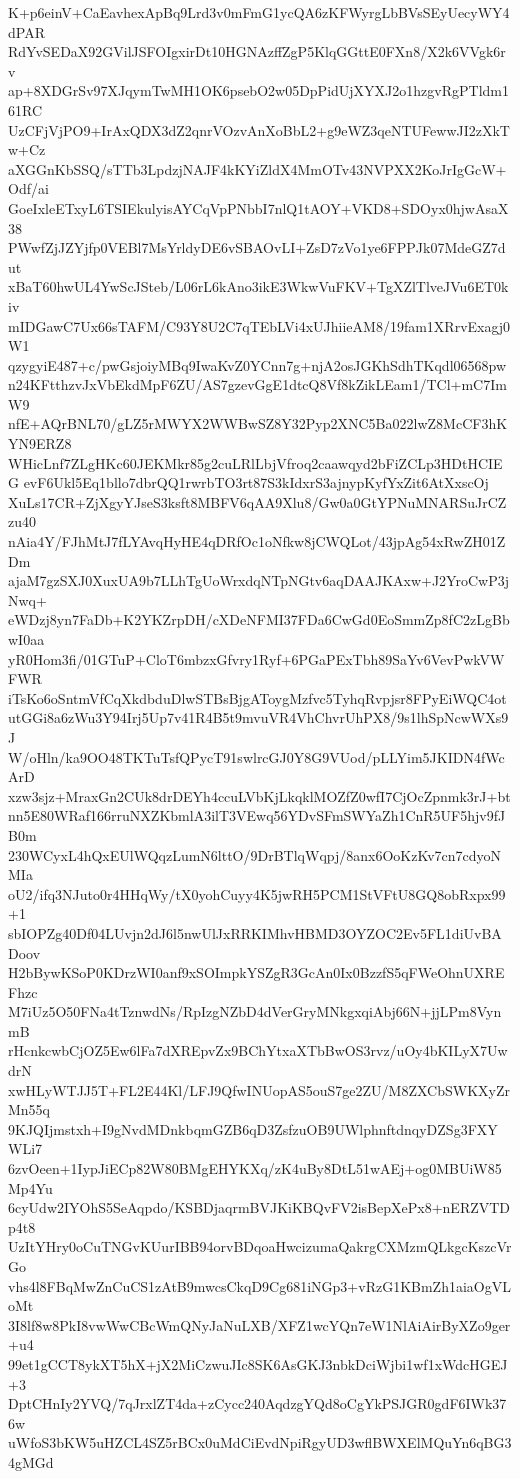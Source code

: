 K+p6einV+CaEavhexApBq9Lrd3v0mFmG1ycQA6zKFWyrgLbBVsSEyUecyWY4dPAR
RdYvSEDaX92GVilJSFOIgxirDt10HGNAzffZgP5KlqGGttE0FXn8/X2k6VVgk6rv
ap+8XDGrSv97XJqymTwMH1OK6psebO2w05DpPidUjXYXJ2o1hzgvRgPTldm161RC
UzCFjVjPO9+IrAxQDX3dZ2qnrVOzvAnXoBbL2+g9eWZ3qeNTUFewwJI2zXkTw+Cz
aXGGnKbSSQ/sTTb3LpdzjNAJF4kKYiZldX4MmOTv43NVPXX2KoJrIgGcW+Odf/ai
GoeIxleETxyL6TSIEkulyisAYCqVpPNbbI7nlQ1tAOY+VKD8+SDOyx0hjwAsaX38
PWwfZjJZYjfp0VEBl7MsYrldyDE6vSBAOvLI+ZsD7zVo1ye6FPPJk07MdeGZ7dut
xBaT60hwUL4YwScJSteb/L06rL6kAno3ikE3WkwVuFKV+TgXZlTlveJVu6ET0kiv
mIDGawC7Ux66sTAFM/C93Y8U2C7qTEbLVi4xUJhiieAM8/19fam1XRrvExagj0W1
qzygyiE487+c/pwGsjoiyMBq9IwaKvZ0YCnn7g+njA2osJGKhSdhTKqdl06568pw
n24KFtthzvJxVbEkdMpF6ZU/AS7gzevGgE1dtcQ8Vf8kZikLEam1/TCl+mC7ImW9
nfE+AQrBNL70/gLZ5rMWYX2WWBwSZ8Y32Pyp2XNC5Ba022lwZ8McCF3hKYN9ERZ8
WHicLnf7ZLgHKc60JEKMkr85g2cuLRlLbjVfroq2caawqyd2bFiZCLp3HDtHCIEG
evF6Ukl5Eq1bllo7dbrQQ1rwrbTO3rt87S3kIdxrS3ajnypKyfYxZit6AtXxscOj
XuLs17CR+ZjXgyYJseS3ksft8MBFV6qAA9Xlu8/Gw0a0GtYPNuMNARSuJrCZzu40
nAia4Y/FJhMtJ7fLYAvqHyHE4qDRfOc1oNfkw8jCWQLot/43jpAg54xRwZH01ZDm
ajaM7gzSXJ0XuxUA9b7LLhTgUoWrxdqNTpNGtv6aqDAAJKAxw+J2YroCwP3jNwq+
eWDzj8yn7FaDb+K2YKZrpDH/cXDeNFMI37FDa6CwGd0EoSmmZp8fC2zLgBbwI0aa
yR0Hom3fi/01GTuP+CloT6mbzxGfvry1Ryf+6PGaPExTbh89SaYv6VevPwkVWFWR
iTsKo6oSntmVfCqXkdbduDlwSTBsBjgAToygMzfvc5TyhqRvpjsr8FPyEiWQC4ot
utGGi8a6zWu3Y94Irj5Up7v41R4B5t9mvuVR4VhChvrUhPX8/9s1lhSpNcwWXs9J
W/oHln/ka9OO48TKTuTsfQPycT91swlrcGJ0Y8G9VUod/pLLYim5JKIDN4fWcArD
xzw3sjz+MraxGn2CUk8drDEYh4ccuLVbKjLkqklMOZfZ0wfI7CjOcZpnmk3rJ+bt
nn5E80WRaf166rruNXZKbmlA3ilT3VEwq56YDvSFmSWYaZh1CnR5UF5hjv9fJB0m
230WCyxL4hQxEUlWQqzLumN6lttO/9DrBTlqWqpj/8anx6OoKzKv7cn7cdyoNMIa
oU2/ifq3NJuto0r4HHqWy/tX0yohCuyy4K5jwRH5PCM1StVFtU8GQ8obRxpx99+1
sbIOPZg40Df04LUvjn2dJ6l5nwUlJxRRKIMhvHBMD3OYZOC2Ev5FL1diUvBADoov
H2bBywKSoP0KDrzWI0anf9xSOImpkYSZgR3GcAn0Ix0BzzfS5qFWeOhnUXREFhzc
M7iUz5O50FNa4tTznwdNs/RpIzgNZbD4dVerGryMNkgxqiAbj66N+jjLPm8VynmB
rHcnkcwbCjOZ5Ew6lFa7dXREpvZx9BChYtxaXTbBwOS3rvz/uOy4bKILyX7UwdrN
xwHLyWTJJ5T+FL2E44Kl/LFJ9QfwINUopAS5ouS7ge2ZU/M8ZXCbSWKXyZrMn55q
9KJQIjmstxh+I9gNvdMDnkbqmGZB6qD3ZsfzuOB9UWlphnftdnqyDZSg3FXYWLi7
6zvOeen+1IypJiECp82W80BMgEHYKXq/zK4uBy8DtL51wAEj+og0MBUiW85Mp4Yu
6cyUdw2IYOhS5SeAqpdo/KSBDjaqrmBVJKiKBQvFV2isBepXePx8+nERZVTDp4t8
UzItYHry0oCuTNGvKUurIBB94orvBDqoaHwcizumaQakrgCXMzmQLkgcKszcVrGo
vhs4l8FBqMwZnCuCS1zAtB9mwcsCkqD9Cg681iNGp3+vRzG1KBmZh1aiaOgVLoMt
3I8lf8w8PkI8vwWwCBcWmQNyJaNuLXB/XFZ1wcYQn7eW1NlAiAirByXZo9ger+u4
99et1gCCT8ykXT5hX+jX2MiCzwuJIc8SK6AsGKJ3nbkDciWjbi1wf1xWdcHGEJ+3
DptCHnIy2YVQ/7qJrxlZT4da+zCycc240AqdzgYQd8oCgYkPSJGR0gdF6IWk376w
uWfoS3bKW5uHZCL4SZ5rBCx0uMdCiEvdNpiRgyUD3wflBWXElMQuYn6qBG34gMGd
